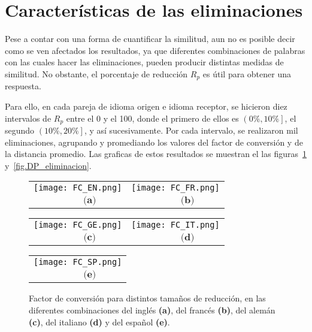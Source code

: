 \section{Características de las eliminaciones}


Pese a contar con una forma de cuantificar la similitud, aun no es posible decir como se ven afectados los resultados, ya que diferentes combinaciones de palabras con las cuales hacer las eliminaciones, pueden producir distintas medidas de similitud.  No obstante, el porcentaje de reducción $R_{p}$ es útil para obtener una respuesta.

Para ello, en cada pareja de idioma origen e idioma receptor, se hicieron diez intervalos de $R_{p}$ entre el 0 y el 100, donde el primero de ellos es $\left(0\%, 10\% \right]$, el segundo $\left(10\%, 20\% \right]$, y así sucesivamente. Por cada intervalo,  se realizaron mil eliminaciones, agrupando y promediando los valores del factor de conversión y de la distancia promedio. Las graficas de estos resultados se muestran el las figuras~\ref{fig.FC_eliminacion} y~\ref{fig.DP_eliminacion}.


\begin{figure}[h!] 
	\centering
	\begin{tabular}{cc}
		\texttt{[image: FC\_EN.png]} &
		\texttt{[image: FC\_FR.png]} \\
		$\,\,\,\,\,\,\,\,\,\,\,\,\,\,\, \textbf{(a)}$      & 
		$\,\,\,\,\,\,\,\,\,\,\,\,\,\,\, \textbf{(b)}$     \\
	\end{tabular}
	
	\begin{tabular}{cc}
		\texttt{[image: FC\_GE.png]} &
		\texttt{[image: FC\_IT.png]} \\
		$\,\,\,\,\,\,\,\,\,\,\,\,\,\,\, \textbf{(c)}$      & $\,\,\,\,\,\,\,\,\,\,\,\,\,\,\, \textbf{(d)}$     \\
	\end{tabular}
	\begin{tabular}{c}
		\texttt{[image: FC\_SP.png]} \\
		$\,\,\,\,\,\,\,\,\,\,\,\,\,\,\, \textbf{(e)}$     \\
	\end{tabular}
	\caption{Factor de conversión para distintos tamaños de reducción, en las diferentes combinaciones del inglés \textbf{(a)}, del francés \textbf{(b)}, del alemán \textbf{(c)}, del italiano \textbf{(d)} y del español \textbf{(e)}.}
	\label{fig.FC_eliminacion}
\end{figure} 


